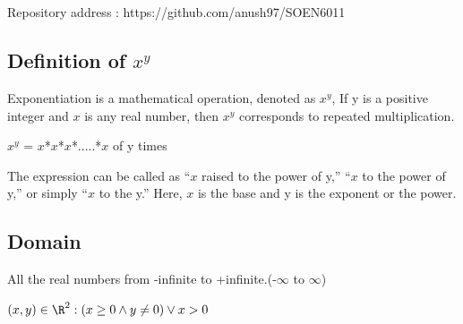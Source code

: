 \documentclass{article}
\begin{document}
\section*{} 
\hfill Repository address : https://github.com/anush97/SOEN6011
\subsection*{Definition of \(x^y\)}
\cite{mathInsight} Exponentiation is a mathematical operation, denoted as \(x^y\), If y is a positive integer and \(x\) is any real number, then \(x^y\) corresponds to repeated multiplication.
 \begin{center} \(x^y\) = \(x\)*\(x\)*\(x\)*.....*\(x\) of y times \end{center}
The expression can be called as “\(x\) raised to the power of y,” “\(x\) to the power of y,” or simply “\(x\) to the y.” Here, \(x\) is the base and y is the exponent or the power.
\subsection*{Domain}
\cite{mathbits} All the real numbers from -infinite to +infinite.(-\(\infty\) to \(\infty\))
 \begin{center} $(x,y) \in \R^2 : (x \geq 0 \land y \neq 0) \lor x>0$ \end{center}
\end{document}
